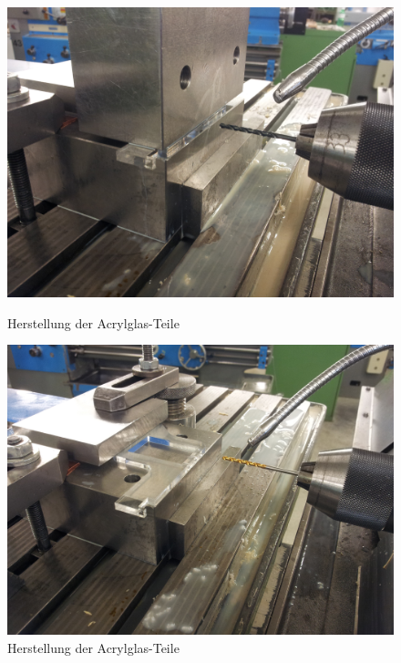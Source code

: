 		\begin{figure}[h!]
			\begin{minipage}[hbt]{0.5\textwidth}
		   		\centering
		   		\includegraphics[width=1\textwidth,clip,trim= 0mm 0mm 0mm 0mm]
		   		{Enddokumentation/Bilder/Herstellung_Acrylglas_1.jpg} 
		   		\caption{Herstellung der Acrylglas-Teile}
		   		\label{fig:Acrylglas_1}
			\end{minipage}
			\hfill
			\begin{minipage}[hbt]{0.5\textwidth}
		   		\centering
		   		\includegraphics[width=1\textwidth,clip,trim= 0mm 0mm 0mm 0mm]
		   		{Enddokumentation/Bilder/Herstellung_Acrylglas_2.jpg} 
		   		\caption{Herstellung der Acrylglas-Teile}
		   		\label{fig:Acrylglas_2}
			\end{minipage}
		\end{figure}
		
